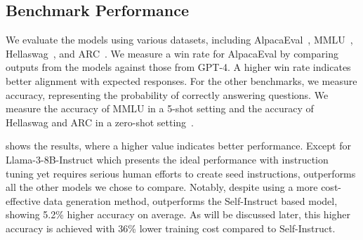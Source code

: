 \subsection{Benchmark Performance}
We evaluate the models using
various datasets, including AlpacaEval~\cite{alpacaeval}, MMLU~\cite{MMLU}, Hellaswag~\cite{hellaswag},
and ARC~\cite{DROP}. 
We measure a win rate for AlpacaEval by comparing 
outputs from the models against those from GPT-4. %
A higher win rate indicates better alignment with expected responses. 
For the other benchmarks, we measure accuracy, 
representing the probability of correctly answering questions.
We measure the accuracy of MMLU in a 5-shot setting and 
the accuracy of Hellaswag and ARC in a zero-shot setting~\cite{scalingllm}.



 shows the results,
where a higher value indicates better performance. 
Except for Llama-3-8B-Instruct which presents the ideal performance
with instruction tuning yet requires serious human efforts to create
seed instructions,
\ours{} outperforms all the other models we chose to compare.
Notably, despite using a more cost-effective data generation method,
\ours{} outperforms the Self-Instruct based model, showing 
5.2\% higher
accuracy on average. 
As will be discussed later, this higher accuracy is achieved with 36\%
lower training cost compared to Self-Instruct.


